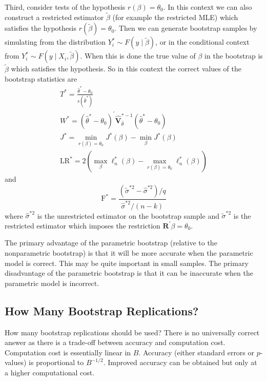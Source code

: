 \documentclass[10pt]{article}
\begin{document}
Third, consider tests of the hypothesis $r(\beta)=\theta_{0}$. In this context we can also construct a restricted estimator $\widetilde{\beta}$ (for example the restricted MLE) which satisfies the hypothesis $r(\widetilde{\beta})=\theta_{0}$. Then we can generate bootstrap samples by simulating from the distribution $Y_{i}^{*} \sim F(y \mid \widetilde{\beta})$, or in the conditional context from $Y_{i}^{*} \sim F\left(y \mid X_{i}, \widetilde{\beta}\right)$. When this is done the true value of $\beta$ in the bootstrap is $\widetilde{\beta}$ which satisfies the hypothesis. So in this context the correct values of the bootstrap statistics are
$$
\begin{gathered}
T^{*}=\frac{\widehat{\theta}^{*}-\theta_{0}}{s\left(\widehat{\theta}^{*}\right)} \\
W^{*}=\left(\widehat{\theta}^{*}-\theta_{0}\right)^{\prime} \widehat{\boldsymbol{V}}_{\widehat{\theta}}^{*-1}\left(\widehat{\theta}^{*}-\theta_{0}\right) \\
J^{*}=\min _{r(\beta)=\theta_{0}} J^{*}(\beta)-\min _{\beta} J^{*}(\beta) \\
\mathrm{LR}^{*}=2\left(\max _{\beta} \ell_{n}^{*}(\beta)-\max _{r(\beta)=\theta_{0}} \ell_{n}^{*}(\beta)\right)
\end{gathered}
$$
and
$$
\mathrm{F}^{*}=\frac{\left(\widetilde{\sigma}^{* 2}-\widehat{\sigma}^{* 2}\right) / q}{\widehat{\sigma}^{* 2} /(n-k)}
$$
where $\widehat{\sigma}^{* 2}$ is the unrestricted estimator on the bootstrap sample and $\widetilde{\sigma}^{* 2}$ is the restricted estimator which imposes the restriction $\boldsymbol{R}^{\prime} \beta=\theta_{0}$.

The primary advantage of the parametric bootstrap (relative to the nonparametric bootstrap) is that it will be more accurate when the parametric model is correct. This may be quite important in small samples. The primary disadvantage of the parametric bootstrap is that it can be inaccurate when the parametric model is incorrect.

\subsection{How Many Bootstrap Replications?}
How many bootstrap replications should be used? There is no universally correct answer as there is a trade-off between accuracy and computation cost. Computation cost is essentially linear in $B$. Accuracy (either standard errors or $p$-values) is proportional to $B^{-1 / 2}$. Improved accuracy can be obtained but only at a higher computational cost.
\end{document}
